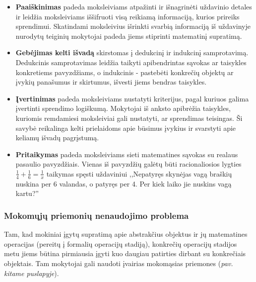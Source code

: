 \documentclass{article}
\begin{document}
\begin{itemize}
\item \textbf{Paaiškinimas} padeda moksleiviams atpažinti ir išnagrinėti uždavinio detales ir leidžia moksleiviams iššifruoti visą reikiamą informaciją, kurios prireiks sprendimui. Skatindami moksleivius išrinkti svarbią informaciją iš uždavinyje nurodytų teiginių mokytojai padeda jiems stiprinti matematinį supratimą.
\item \textbf{Gebėjimas kelti išvadą} skirstomas į dedukcinį ir indukcinį samprotavimą. Dedukcinis samprotavimas leidžia taikyti apibendrintas sąvokas ar taisykles konkretiems pavyzdžiams, o indukcinis - pastebėti konkrečių objektų ar įvykių panašumus ir skirtumus, išvesti jiems bendras taisykles.
\item \textbf{Įvertinimas} padeda moksleiviams nustatyti kriterijus, pagal kuriuos galima įvertinti sprendimo logiškumą. Mokytojai iš anksto apibrėžia taisykles, kuriomis remdamiesi moksleiviai gali nustatyti, ar sprendimas teisingas. Ši savybė reikalinga kelti prielaidoms apie būsimus įvykius ir svarstyti apie keliamų išvadų pagrįstumą.
\item \textbf{Pritaikymas} padeda moksleiviams sieti matematines sąvokas su realaus pasaulio pavyzdžiais. Vienas iš pavyzdžių galėtų būti racionaliosios lygties $\frac{1}{4}+\frac{1}{6}=\frac{1}{x}$ taikymas spęsti uždaviniui ,,Nepatyręs skynėjas vagą braškių nuskina per 6 valandas, o patyręs per 4. Per kiek laiko jie nuskins vagą kartu?''
\end{itemize}

\subsubsection{Mokomųjų priemonių nenaudojimo problema}

Tam, kad mokiniai įgytų supratimą apie abstrakčius objektus ir jų matematines operacijas (pereitų į formalių operacijų stadiją), konkrečių operacijų stadijos metu jiems būtina pirmiausia įgyti kuo daugiau patirties dirbant su konkrečiais objektais. Tam mokytojai gali naudoti įvairias mokomąsias priemones (\textit{pav. kitame puslapyje}).
\end{document}
